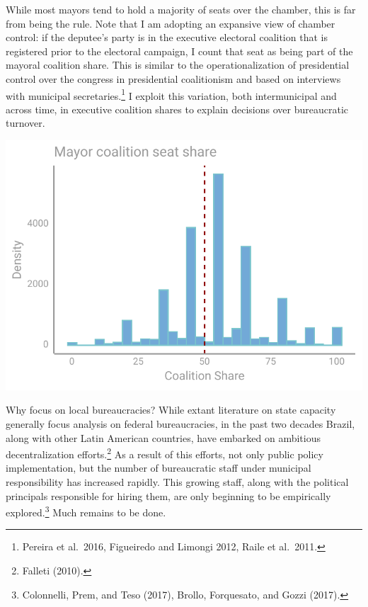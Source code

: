 \documentclass[12pt,]{article}
\let\rmarkdownfootnote\footnote%
\def\footnote{\protect\rmarkdownfootnote}
\begin{document}
While most mayors tend to hold a majority of seats over the chamber,
this is far from being the rule. Note that I am adopting an expansive
view of chamber control: if the deputee's party is in the executive
electoral coalition that is registered prior to the electoral campaign,
I count that seat as being part of the mayoral coalition share. This is
similar to the operationalization of presidential control over the
congress in presidential coalitionism and based on interviews with
municipal secretaries.\footnote{Pereira et al.~2016, Figueiredo and
  Limongi 2012, Raile et al.~2011.} I exploit this variation, both
intermunicipal and across time, in executive coalition shares to explain
decisions over bureaucratic turnover.

\begin{center}\includegraphics{dissertation_files/figure-latex/cabinet coalition share-1} \end{center}

Why focus on local bureaucracies? While extant literature on state
capacity generally focus analysis on federal bureaucracies, in the past
two decades Brazil, along with other Latin American countries, have
embarked on ambitious decentralization efforts.\footnote{Falleti (2010).}
As a result of this efforts, not only public policy implementation, but
the number of bureaucratic staff under municipal responsibility has
increased rapidly. This growing staff, along with the political
principals responsible for hiring them, are only beginning to be
empirically explored.\footnote{Colonnelli, Prem, and Teso (2017),
  Brollo, Forquesato, and Gozzi (2017).} Much remains to be done.
\end{document}
